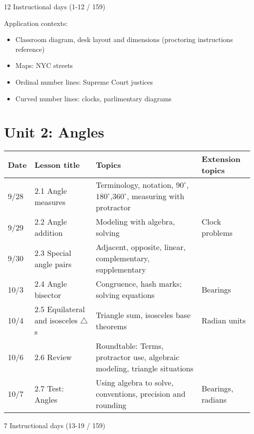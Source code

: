 12 Instructional days (1-12 / 159)

Application contexts: 
\begin{itemize}
  \item Classroom diagram, desk layout and dimensions (proctoring instructions reference)
  \item Maps: NYC streets
  \item Ordinal number lines: Supreme Court justices
  \item Curved number lines: clocks, parlimentary diagrams
\end{itemize}


\newpage
\section*{Unit 2: Angles}
\begin{tabular}{|p{0.9cm}|p{4cm}|p{7cm}|p{5cm}|}
  \hline
  Date & Lesson title & Topics  & Extension topics \\
  \hline
  9/28 & 2.1 Angle measures & Terminology, notation, $90^\circ$, $180^\circ$,$360^\circ$, measuring with protractor &  \\
  \hline
  9/29 & 2.2 Angle addition & Modeling with algebra, solving & Clock problems \\
  \hline
  9/30 & 2.3 Special angle pairs & Adjacent, opposite, linear, complementary, supplementary &  \\
  \hline
  10/3 & 2.4 Angle bisector & Congruence, hash marks; solving equations & Bearings \\
  \hline
  10/4 & 2.5 Equilateral and isosceles $\triangle$s & Triangle sum, isosceles base theorems & Radian units \\
  \hline
  10/6 & 2.6 Review & Roundtable: Terms, protractor use, algebraic modeling, triangle situations & \\
  \hline
  10/7 & 2.7 Test: Angles & Using algebra to solve, conventions, precision and rounding & Bearings, radians \\
  \hline

\end{tabular} \par \vspace*{0.3cm}
7 Instructional days (13-19 / 159)

